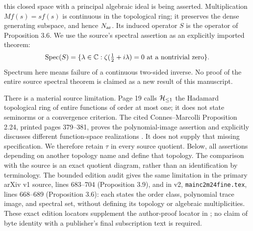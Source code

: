 this closed space with a principal algebraic ideal is being asserted.
Multiplication $M f(s)=sf(s)$ is continuous in the topological ring;
it preserves the dense generating subspace, and hence $N_{\rm ar}$.
Its induced operator $S$ is the operator of Proposition 3.6.
We use the source's spectral assertion as an explicitly imported theorem:
\begin{equation}\label{eq:cq-source-spectrum}
 \operatorname{Spec}(S)=\{\lambda\in\mathbb C:
             \zeta(\tfrac12+i\lambda)=0
             \text{ at a nontrivial zero}\}.
\end{equation}
Spectrum here means failure of a continuous two-sided inverse.
No proof of the entire source spectral theorem is claimed as a new
result of this manuscript.

There is a material source limitation. Page 19 calls $\mathcal H_{\leq 1}$ the
Hadamard topological ring of entire functions of order at most one;
it does not state seminorms or a convergence criterion. The cited
Connes--Marcolli Proposition 2.24, printed pages 379--381,
proves the polynomial-image assertion and explicitly discusses
different function-space realizations \cite{cqCM}. It does not supply
that missing specification. We therefore retain $\tau$ in every
source quotient. Below, all assertions depending on another topology
name and define that topology. The comparison with the source is an
exact quotient diagram, rather than an identification by terminology.
The bounded edition audit gives the same limitation in the primary
arXiv v1 source, lines 683--704 (Proposition 3.9), and in v2,
\texttt{mainc2m24fine.tex}, lines 668--689 (Proposition 3.6):
each states the order class, polynomial trace image, and spectral
set, without defining its topology or algebraic multiplicities.
These exact edition locators supplement the author-proof locator
in \cite{cqCCM}; no claim of byte identity with a publisher's final
subscription text is required.

